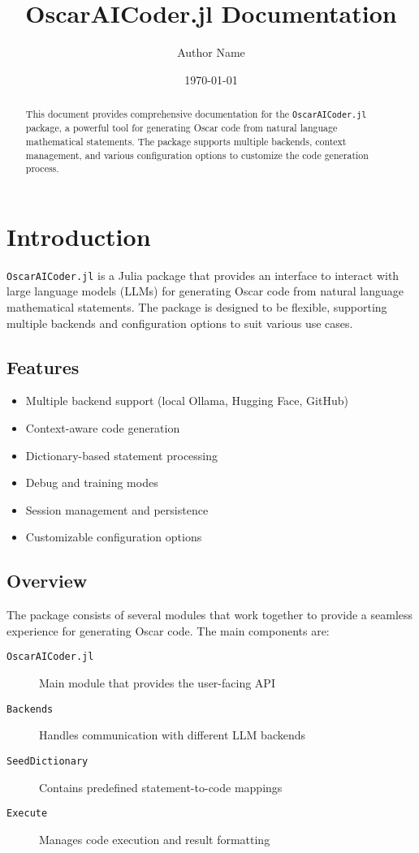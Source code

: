 \documentclass[11pt,a4paper]{article}
\title{OscarAICoder.jl Documentation}
\author{Author Name}
\date{\today}
\newcommand{\modname}[1]{\texttt{#1}}
\begin{document}
\maketitle
\thispagestyle{empty}

\begin{abstract}
This document provides comprehensive documentation for the \modname{OscarAICoder.jl} package, a powerful tool for generating Oscar code from natural language mathematical statements. The package supports multiple backends, context management, and various configuration options to customize the code generation process.
\end{abstract}

\section{Introduction}
\label{sec:introduction}

\modname{OscarAICoder.jl} is a Julia package that provides an interface to interact with large language models (LLMs) for generating Oscar code from natural language mathematical statements. The package is designed to be flexible, supporting multiple backends and configuration options to suit various use cases.

\subsection{Features}
\begin{itemize}
    \item Multiple backend support (local Ollama, Hugging Face, GitHub)
    \item Context-aware code generation
    \item Dictionary-based statement processing
    \item Debug and training modes
    \item Session management and persistence
    \item Customizable configuration options
\end{itemize}

\subsection{Overview}
The package consists of several modules that work together to provide a seamless experience for generating Oscar code. The main components are:

\begin{description}
    \item[\modname{OscarAICoder.jl}] Main module that provides the user-facing API
    \item[\modname{Backends}] Handles communication with different LLM backends
    \item[\modname{SeedDictionary}] Contains predefined statement-to-code mappings
    \item[\modname{Execute}] Manages code execution and result formatting
\end{description}
\end{document}
